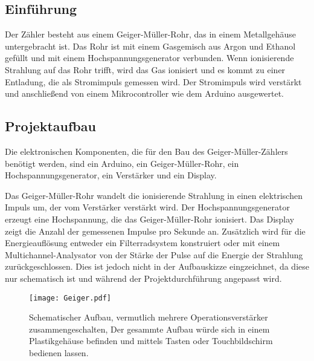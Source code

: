 \centering
\subsection*{Einführung}
Der Zähler besteht aus einem Geiger-Müller-Rohr, das in einem Metallgehäuse untergebracht ist. 
Das Rohr ist mit einem Gasgemisch aus Argon und Ethanol gefüllt und mit einem Hochspannungsgenerator verbunden. 
Wenn ionisierende Strahlung auf das Rohr trifft, wird das Gas ionisiert und es kommt zu einer Entladung, die als Stromimpuls gemessen wird. 
Der Stromimpuls wird verstärkt und anschließend von einem Mikrocontroller wie dem Arduino ausgewertet.
\subsection*{Projektaufbau}
Die elektronischen Komponenten, die für den Bau des Geiger-Müller-Zählers benötigt werden, sind ein Arduino, ein Geiger-Müller-Rohr, ein Hochspannungsgenerator, ein Verstärker und ein Display.

Das Geiger-Müller-Rohr wandelt die ionisierende Strahlung in einen elektrischen Impuls um, der vom Verstärker verstärkt wird. 
Der Hochspannungsgenerator erzeugt eine Hochspannung, die das Geiger-Müller-Rohr ionisiert. 
Das Display zeigt die Anzahl der gemessenen Impulse pro Sekunde an.
Zusätzlich wird für die Energieauflösung entweder ein Filterradsystem konstruiert oder mit einem Multichannel-Analysator von der Stärke der Pulse auf die Energie der Strahlung zurückgeschlossen.
Dies ist jedoch nicht in der Aufbauskizze eingzeichnet, da diese nur schematisch ist und während der Projektdurchführung angepasst wird. 

\begin{figure}[H]
    \centering
    \texttt{[image: Geiger.pdf]}
    \caption{Schematischer Aufbau, vermutlich mehrere Operationsverstärker zusammengeschalten, Der gesammte Aufbau würde sich in einem Plastikgehäuse befinden und mittels Tasten oder Touchbildschirm bedienen lassen.}
\end{figure}
